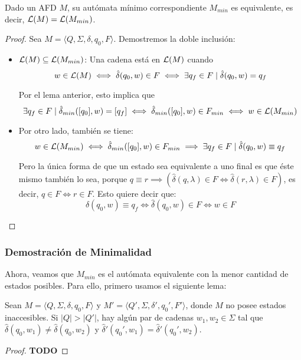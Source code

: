 \begin{theorem*}
    Dado un AFD $M$, su autómata mínimo correspondiente $M_{min}$ es equivalente, es decir, $\mathcal{L}(M) = \mathcal{L}(M_{min})$.
\end{theorem*}
\begin{proof}
    Sea $M = \langle Q, \Sigma, \delta, q_0, F \rangle$. Demostremos la doble inclusión:
    \begin{itemize}
        \item $\mathcal{L}(M) \subseteq \mathcal{L}(M_{min})$: Una cadena está en $\mathcal{L}(M)$ cuando
              $$
                  w \in \mathcal{L}(M) \iff \hat\delta(q_0, w) \in F \iff \exists q_f \in F \mid \hat\delta(q_0, w) = q_f
              $$

              Por el lema anterior, esto implica que
              $$\exists q_f \in F \mid \hat\delta_{min}([q_0], w) = [q_f] \iff \hat\delta_{min}([q_0], w) \in F_{min} \iff w \in \mathcal{L}(M_{min})$$
        \item Por otro lado, también se tiene:
              $$
                  w \in \mathcal{L}(M_{min}) \iff \hat\delta_{min}([q_0], w) \in F_{min} \implies
                  \exists q_f \in F \mid \hat\delta(q_0, w) \equiv q_f
              $$

              Pero la única forma de que un estado sea equivalente a uno final es que éste mismo también lo sea, porque $q \equiv r \implies (\hat\delta(q, \lambda) \in F \iff \hat\delta(r, \lambda) \in F)$, es decir, $q \in F \iff r \in F$. Esto quiere decir que:
              $$
                  \hat\delta(q_0, w) \equiv q_f \iff \hat\delta(q_0, w) \in F \iff w \in F
              $$
    \end{itemize}
\end{proof}

\subsubsection{Demostración de Minimalidad}

Ahora, veamos que $M_{min}$ es el autómata equivalente con la menor cantidad de estados posibles. Para ello, primero usamos el siguiente lema:

\begin{lemma*}
    Sean $M = \langle Q, \Sigma, \delta, q_0, F \rangle$ y $M' = \langle Q', \Sigma, \delta', q_0', F' \rangle$, donde $M$ no posee estados inaccesibles. Si $|Q| > |Q'|$, hay algún par de cadenas $w_1, w_2 \in \Sigma$ tal que $\hat\delta(q_0, w_1) \neq \hat\delta(q_0, w_2)$ y $\hat\delta'(q_0', w_1) = \hat\delta'(q_0', w_2)$.
\end{lemma*}
\begin{proof}
    \textbf{TODO}
\end{proof}

